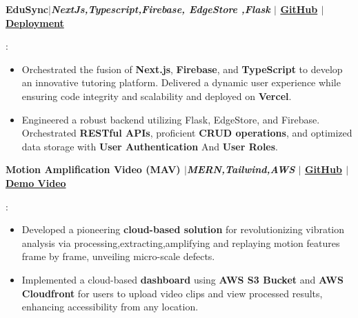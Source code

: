 \documentclass[a4paper,11pt]{article}
\newcommand{\resumeItem}[2]{
  \item\small{
    \textbf{#1}{: #2 \vspace{-2pt}}
  }
}
\newcommand{\resumeSubItem}[2]{\resumeItem{#1}{#2}\vspace{-3pt}}
\begin{document}
\resumeSubItem{\textbf{EduSync}$|$\emph{NextJs,Typescript,Firebase, EdgeStore ,Flask} 
$|$
\textmd{\href{https://github.com/Akash-Singh04/EduSync}{GitHub}}
$|$
\textmd{\href{https://edu-sync-phi.vercel.app/}{Deployment}}
}{
\vspace{-5pt}
\begin{itemize}
\item Orchestrated the fusion of \textbf{Next.js}, \textbf{Firebase}, and \textbf{TypeScript} to develop an innovative tutoring platform. Delivered a dynamic user experience while ensuring code integrity and scalability and deployed on \textbf{Vercel}.
\item Engineered a robust backend utilizing Flask, EdgeStore, and Firebase. Orchestrated \textbf{RESTful APIs}, proficient \textbf{CRUD operations}, and optimized data storage with \textbf{User Authentication} And \textbf{User Roles}.
\end{itemize}
}
\vspace{-5pt}

\resumeSubItem{\textbf{Motion Amplification Video (MAV)} $|$\emph{MERN,Tailwind,AWS}
$|$
\textmd{\href{https://github.com/Akash-Singh04/Motion-Amplification-Video}{GitHub}}
$|$
\textmd{\href{https://youtu.be/ygeVFEa4_oo}{Demo Video}
}
}{
\vspace{-5pt}
\begin{itemize}
\item Developed a pioneering \textbf{cloud-based solution} for revolutionizing vibration analysis via processing,extracting,amplifying and replaying motion features frame by frame, unveiling micro-scale defects.
\item Implemented a cloud-based \textbf{dashboard} using \textbf{AWS S3 Bucket} and \textbf{AWS Cloudfront} for users to upload video clips and view processed results, enhancing accessibility from any location.
\end{itemize}
\vspace{-5pt}
}
\end{document}
